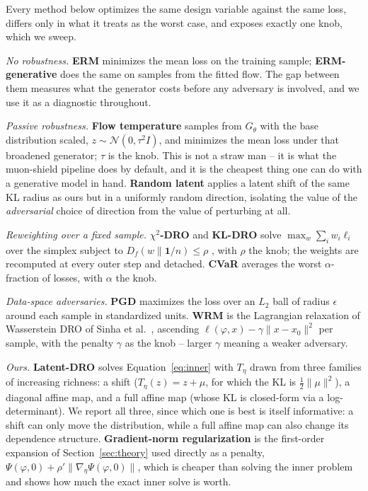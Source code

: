 \documentclass[11pt]{article}
\newcommand{\design}{\varphi}
\newcommand{\latent}{z}
\newcommand{\Div}{D_f}
\begin{document}
Every method below optimizes the same design variable against the same loss, differs only
in what it treats as the worst case, and exposes exactly one knob, which we sweep.

\emph{No robustness.} \textbf{ERM} minimizes the mean loss on the training sample;
\textbf{ERM-generative} does the same on samples from the fitted flow. The gap between them
measures what the generator costs before any adversary is involved, and we use it as a
diagnostic throughout.

\emph{Passive robustness.} \textbf{Flow temperature} samples from $G_\theta$ with the base
distribution scaled, $\latent \sim \mathcal N(0, \tau^2 I)$, and minimizes the mean loss
under that broadened generator; $\tau$ is the knob. This is not a straw man -- it is what
the muon-shield pipeline does by default, and it is the cheapest thing one can do with a
generative model in hand. \textbf{Random latent} applies a latent shift of the same KL
radius as ours but in a uniformly random direction, isolating the value of the
\emph{adversarial} choice of direction from the value of perturbing at all.

\emph{Reweighting over a fixed sample.} \textbf{$\chi^2$-DRO} and \textbf{KL-DRO} solve
$\max_w \sum_i w_i \ell_i$ over the simplex subject to $\Div(w \| \mathbf{1}/n) \le \rho$
\citep{namkoong2016,duchi2021}, with $\rho$ the knob; the weights are recomputed at every
outer step and detached. \textbf{CVaR} averages the worst $\alpha$-fraction of losses, with
$\alpha$ the knob.

\emph{Data-space adversaries.} \textbf{PGD} maximizes the loss over an $L_2$ ball of radius
$\epsilon$ around each sample in standardized units. \textbf{WRM} is the Lagrangian
relaxation of Wasserstein DRO of Sinha et al.\ \citep{sinha2018}, ascending
$\ell(\design,x) - \gamma\|x - x_0\|^2$ per sample, with the penalty $\gamma$ as the knob --
larger $\gamma$ meaning a weaker adversary.

\emph{Ours.} \textbf{Latent-DRO} solves Equation~\ref{eq:inner} with $T_\eta$ drawn from
three families of increasing richness: a shift ($T_\eta(\latent) = \latent + \mu$, for which
the KL is $\tfrac12\|\mu\|^2$), a diagonal affine map, and a full affine map (whose KL is
closed-form via a log-determinant). We report all three, since which one is best is itself
informative: a shift can only move the distribution, while a full affine map can also change
its dependence structure. \textbf{Gradient-norm regularization} is the first-order expansion
of Section~\ref{sec:theory} used directly as a penalty, $\Psi(\design,0) + \rho'\|\nabla_\eta
\Psi(\design,0)\|$, which is cheaper than solving the inner problem and shows how much the
exact inner solve is worth.
\end{document}
